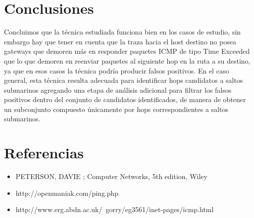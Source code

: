 \documentclass[10pt, a4paper]{article}
\begin{document}
\section{Conclusiones}

Concluimos que la técnica estudiada funciona bien en los casos de estudio, sin embargo hay que tener en cuenta que la traza hacia el host destino no posea gateways que demoren más en responder paquetes ICMP de tipo Time Exceeded que lo que demoren en reenviar paquetes al siguiente hop en la ruta a su destino, ya que en esos casos la técnica podría producir falsos positivos.
En el caso general, esta técnica resulta adecuada para identificar hops candidatos a saltos submarinos agregando una etapa de análisis adicional para filtrar los falsos positivos dentro del conjunto de candidatos identificados, de manera de obtener un subconjunto compuesto únicamente por hops correspondientes a saltos submarinos.

\section{Referencias}
\begin{itemize}
\item PETERSON, DAVIE ; Computer Networks, 5th edition, Wiley

\item http://openmaniak.com/ping.php

\item http://www.erg.abdn.ac.uk/~gorry/eg3561/inet-pages/icmp.html
\end{itemize}
\end{document}

